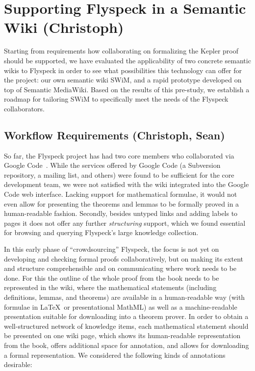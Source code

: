\section{Supporting Flyspeck in a Semantic Wiki (Christoph)}

Starting from requirements how collaborating on formalizing the Kepler proof should be
supported, we have evaluated the applicability of two concrete semantic wikis to Flyspeck
in order to see what possibilities this technology can offer for the project:  our own
semantic wiki SWiM, and a rapid prototype developed on top of Semantic MediaWiki.  Based on the
results of this pre-study, we establish a roadmap for tailoring SWiM to specifically meet
the needs of the Flyspeck collaborators.

\subsection{Workflow Requirements (Christoph, Sean)}
\label{sec:req}

So far, the Flyspeck project has had two core members who
collaborated via Google Code~\cite{flyspeck:web}.  While the services offered by Google
Code (a Subversion repository, a mailing list, and others) were found to be sufficient for
the core development team, we were not satisfied with the wiki integrated into the Google
Code web interface.  Lacking support for mathematical formulae, it would not even allow
for presenting the theorems and lemmas to be formally proved in a human-readable fashion.
Secondly, besides untyped links and adding labels to pages it does not offer any further
\emph{structuring} support, which we found essential for browsing and querying Flyspeck's
large knowledge collection.

In this early phase of ``crowdsourcing'' Flyspeck, the focus is not yet on developing and
checking formal proofs collaboratively, but on making its extent and structure
comprehensible and on communicating where work needs to be done.  For this the outline of
the whole proof from the book needs to be represented in the wiki, where the
mathematical statements (including definitions, lemmas, and theorems) are available in a
human-readable way (with formulae in \LaTeX\ or presentational MathML) as well as a
machine-readable presentation suitable for downloading into a theorem prover.  In order to
obtain a well-structured network of knowledge items, each mathematical statement should be
presented on one wiki page, which shows its human-readable representation from the book,
offers additional space for annotation, and allows for downloading a formal
representation.  We considered the following kinds of annotations desirable:

